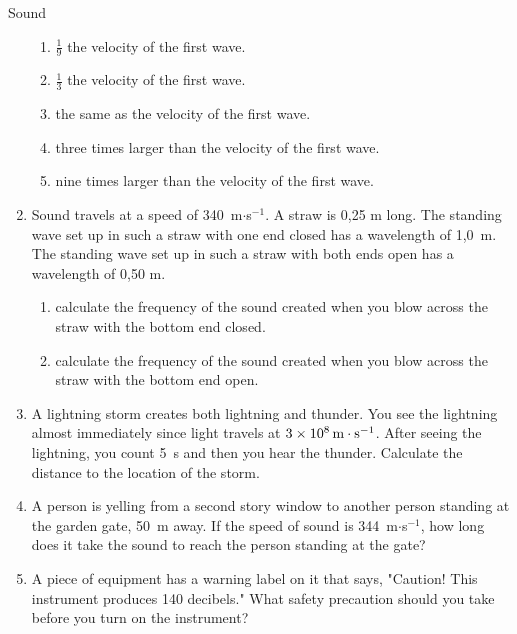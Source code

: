 \begin{eocexercises}{Sound}
\begin{enumerate}[noitemsep, label=\textbf{\arabic*}. ]
\label{m38800*id187073}\begin{enumerate}[noitemsep, label=\textbf{\alph*}. ] 
            \label{m38800*uid83}\item $\frac{1}{9}$ the velocity of the first wave.
\label{m38800*uid84}\item $\frac{1}{3}$ the velocity of the first wave.
\label{m38800*uid85}\item the same as the velocity of the first wave.
\label{m38800*uid86}\item three times larger than the velocity of the first wave.
\label{m38800*uid87}\item nine times larger than the velocity of the first wave.
\end{enumerate}
                \label{m38800*uid88}\item Sound travels at a speed of 340~m$\ensuremath{\cdot}$s${}^{-1}$. A straw is 0,25 m long. The standing wave set up in such a straw with one end closed has a wavelength of 1,0~m. The standing wave set up in such a straw with both ends open has a wavelength of 0,50 m.
\label{m38800*id187205}\begin{enumerate}[noitemsep, label=\textbf{\alph*}. ] 
            \label{m38800*uid89}\item calculate the frequency of the sound created when you blow across the straw with the bottom end closed.
\label{m38800*uid90}\item calculate the frequency of the sound created when you blow across the straw with the bottom end open.
\end{enumerate}
                \label{m38800*uid91}\item A lightning storm creates both lightning and thunder. You see the lightning almost immediately since light travels at $3\ensuremath{\times}{10}^{8}\phantom{\rule{0.166667em}{0ex}}\text{m}\ensuremath{\cdot}{\text{s}}^{-1}$. After seeing the lightning, you count 5~s and then you hear the thunder. Calculate the distance to the location of the storm.\newline
\label{m38800*uid92}\item A person is yelling from a second story window to another person standing at the garden gate, 50~m away. If the speed of sound is 344~m$\ensuremath{\cdot}$s${}^{-1}$, how long does it take the sound to reach the person standing at the gate?\newline
\label{m38800*uid93}\item A piece of equipment has a warning label on it that says, "Caution! This instrument produces 140 decibels." What safety precaution should you take before you turn on the instrument?\newline

\end{enumerate}
\end{eocexercises}
